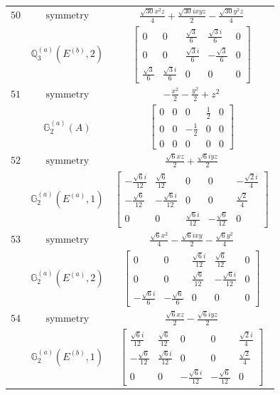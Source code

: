 \documentclass[fleqn,8pt,landscape]{jsarticle}
\begin{document}
\begin{longtable}{ccc}
$ 50 $ & $ \text{symmetry} $ & $ \frac{\sqrt{30} x^{2} z}{4} + \frac{\sqrt{30} i x y z}{2} - \frac{\sqrt{30} y^{2} z}{4} $ \\
$  $ & $ \mathbb{Q}_{3}^{(a)}(E^{(b)},2) $ & $ \begin{bmatrix} 0 & 0 & \frac{\sqrt{3}}{6} & \frac{\sqrt{3} i}{6} & 0 \\ 0 & 0 & \frac{\sqrt{3} i}{6} & - \frac{\sqrt{3}}{6} & 0 \\ \frac{\sqrt{3}}{6} & \frac{\sqrt{3} i}{6} & 0 & 0 & 0 \end{bmatrix} $ \\ \hline
$ 51 $ & $ \text{symmetry} $ & $ - \frac{x^{2}}{2} - \frac{y^{2}}{2} + z^{2} $ \\
$  $ & $ \mathbb{G}_{2}^{(a)}(A) $ & $ \begin{bmatrix} 0 & 0 & 0 & \frac{1}{2} & 0 \\ 0 & 0 & - \frac{1}{2} & 0 & 0 \\ 0 & 0 & 0 & 0 & 0 \end{bmatrix} $ \\ \hline
$ 52 $ & $ \text{symmetry} $ & $ \frac{\sqrt{6} x z}{2} + \frac{\sqrt{6} i y z}{2} $ \\
$  $ & $ \mathbb{G}_{2}^{(a)}(E^{(a)},1) $ & $ \begin{bmatrix} - \frac{\sqrt{6} i}{12} & \frac{\sqrt{6}}{12} & 0 & 0 & - \frac{\sqrt{2} i}{4} \\ - \frac{\sqrt{6}}{12} & - \frac{\sqrt{6} i}{12} & 0 & 0 & \frac{\sqrt{2}}{4} \\ 0 & 0 & \frac{\sqrt{6} i}{12} & - \frac{\sqrt{6}}{12} & 0 \end{bmatrix} $ \\ \hline
$ 53 $ & $ \text{symmetry} $ & $ \frac{\sqrt{6} x^{2}}{4} - \frac{\sqrt{6} i x y}{2} - \frac{\sqrt{6} y^{2}}{4} $ \\
$  $ & $ \mathbb{G}_{2}^{(a)}(E^{(a)},2) $ & $ \begin{bmatrix} 0 & 0 & \frac{\sqrt{6} i}{12} & \frac{\sqrt{6}}{12} & 0 \\ 0 & 0 & \frac{\sqrt{6}}{12} & - \frac{\sqrt{6} i}{12} & 0 \\ - \frac{\sqrt{6} i}{6} & - \frac{\sqrt{6}}{6} & 0 & 0 & 0 \end{bmatrix} $ \\ \hline
$ 54 $ & $ \text{symmetry} $ & $ \frac{\sqrt{6} x z}{2} - \frac{\sqrt{6} i y z}{2} $ \\
$  $ & $ \mathbb{G}_{2}^{(a)}(E^{(b)},1) $ & $ \begin{bmatrix} \frac{\sqrt{6} i}{12} & \frac{\sqrt{6}}{12} & 0 & 0 & \frac{\sqrt{2} i}{4} \\ - \frac{\sqrt{6}}{12} & \frac{\sqrt{6} i}{12} & 0 & 0 & \frac{\sqrt{2}}{4} \\ 0 & 0 & - \frac{\sqrt{6} i}{12} & - \frac{\sqrt{6}}{12} & 0 \end{bmatrix} $ \\ \hline

\end{longtable}
\end{document}
